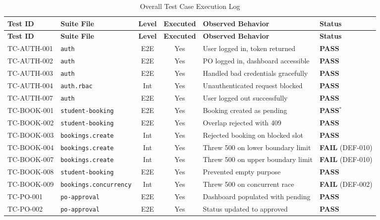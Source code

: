 \documentclass[11pt,a4paper]{article}
\begin{document}
\begin{center}
\begin{longtable}{@{}lp{3.6cm}ccp{4.5cm}p{2cm}@{}}
\caption{Overall Test Case Execution Log} \label{tab:exec_log} \\
\toprule
\textbf{Test ID} & \textbf{Suite File} & \textbf{Level} & \textbf{Executed} & \textbf{Observed Behavior} & \textbf{Status} \\ \midrule
\endfirsthead
\toprule
\textbf{Test ID} & \textbf{Suite File} & \textbf{Level} & \textbf{Executed} & \textbf{Observed Behavior} & \textbf{Status} \\ \midrule
\endhead
\bottomrule
\endfoot
\bottomrule
\endlastfoot

TC-AUTH-001 & \texttt{auth} & E2E & Yes & User logged in, token returned & \textbf{PASS} \\
TC-AUTH-002 & \texttt{auth} & E2E & Yes & PO logged in, dashboard accessible & \textbf{PASS} \\
TC-AUTH-003 & \texttt{auth} & E2E & Yes & Handled bad credentials gracefully & \textbf{PASS} \\
TC-AUTH-004 & \texttt{auth.rbac} & Int & Yes & Unauthenticated request blocked & \textbf{PASS} \\
TC-AUTH-007 & \texttt{auth} & E2E & Yes & User logged out successfully & \textbf{PASS} \\ \midrule
TC-BOOK-001 & \texttt{student-booking} & E2E & Yes & Booking created as pending & \textbf{PASS}$^{*}$ \\
TC-BOOK-002 & \texttt{student-booking} & E2E & Yes & Overlap rejected with 409 & \textbf{PASS} \\
TC-BOOK-003 & \texttt{bookings.create} & Int & Yes & Rejected booking on blocked slot & \textbf{PASS} \\
TC-BOOK-004 & \texttt{bookings.create} & Int & Yes & Threw 500 on lower boundary limit & \textbf{FAIL} (DEF-010) \\
TC-BOOK-007 & \texttt{bookings.create} & Int & Yes & Threw 500 on upper boundary limit & \textbf{FAIL} (DEF-010) \\
TC-BOOK-008 & \texttt{student-booking} & E2E & Yes & Prevented empty purpose & \textbf{PASS} \\
TC-BOOK-009 & \texttt{bookings.concurrency} & Int & Yes & Threw 500 on concurrent race & \textbf{FAIL} (DEF-002) \\ \midrule
TC-PO-001 & \texttt{po-approval} & E2E & Yes & Dashboard populated with pending & \textbf{PASS} \\
TC-PO-002 & \texttt{po-approval} & E2E & Yes & Status updated to approved & \textbf{PASS} \\

\end{longtable}
\end{center}
\end{document}
